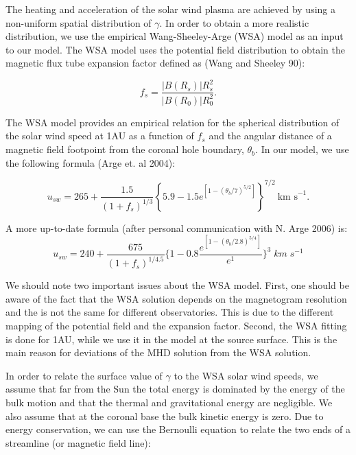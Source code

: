 The heating and acceleration of the solar wind plasma are achieved by using a 
non-uniform spatial distribution of $\gamma$. In order to obtain a more 
realistic distribution, we use the empirical Wang-Sheeley-Arge (WSA) model as 
an input to our model. The WSA model uses the potential field distribution to 
obtain the magnetic flux tube expansion factor defined as 
(Wang and Sheeley 90):

\begin{equation}
\label{expansionfactor}
f_s=\frac{|B(R_{s})|R^2_{s}}{|B(R_0)| R^2_0}.
\end{equation}

The WSA model provides an empirical relation for the spherical distribution 
of the solar wind speed at 1AU as a function of $f_s$ and the angular distance 
of a magnetic field footpoint from the coronal hole boundary, $\theta_b$. 
In our model, we use the following formula (Arge et. al 2004):

\begin{equation} 
\label{eq:WSA1}
u_{sw}  = 265 + \frac{1.5}{(1+f_s)^{1/3}} \left \{ 5.9 - 1.5 e^{\left[1 -
\left(\theta_b / 7 \right)^{5/2} \right]} \right \}^{7/2}~\mbox{km s}^{-1}.
\end{equation}

A more up-to-date formula (after personal communication with N. Arge 2006) is:
\begin{equation}
\label{eq:WSA1}
u_{sw}=240+\frac{675}{(1+f_s)^{1/4.5}}
\{ 1-0.8\frac{e^{[1-(\theta_b/2.8)^{5/4}]}}{e^1}  \}^3\;km\;s^{-1} 
\end{equation}

We should note two important issues about the WSA model. First, one should be 
aware of the fact that the WSA solution depends on the magnetogram resolution 
and the is not the same for different observatories. This is due to the 
different mapping of the potential field and the expansion factor. Second, 
the WSA fitting is done for 1AU, while we use it in the model at the source 
surface. This is the main reason for deviations of the MHD solution from the 
WSA solution. 

In order to relate the surface value of $\gamma$ to the WSA solar wind speeds, 
we assume that far from the Sun the total energy is dominated by the energy of 
the bulk motion and that the thermal and gravitational energy are negligible. 
We also assume that at the coronal base the bulk kinetic energy is zero. 
Due to energy conservation, we can use the Bernoulli equation to relate the 
two ends of a streamline (or magnetic field line):

